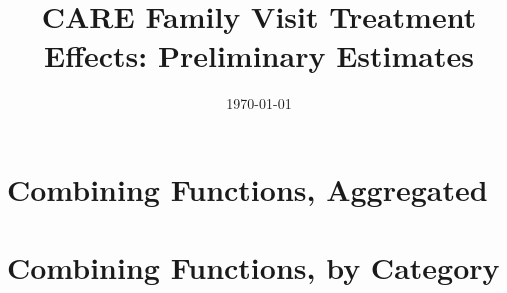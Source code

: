 
 

\title{CARE Family Visit Treatment Effects: Preliminary Estimates} 

\date{\today} 

 

\maketitle 

\tableofcontents 

\clearpage 


\def\arraystretch{0.6}

\setlength\tabcolsep{0.3em}

\section{{Combining Functions, Aggregated}}


\begin{center}
	
\end{center}

\begin{center}
	
\end{center}

\begin{center}
	
\end{center}
\section{{Combining Functions, by Category}}


\begin{center}
	
\end{center}

\begin{center}
	
\end{center}

\begin{center}
	
\end{center}

\begin{center}
	
\end{center}

\begin{center}
	
\end{center}

